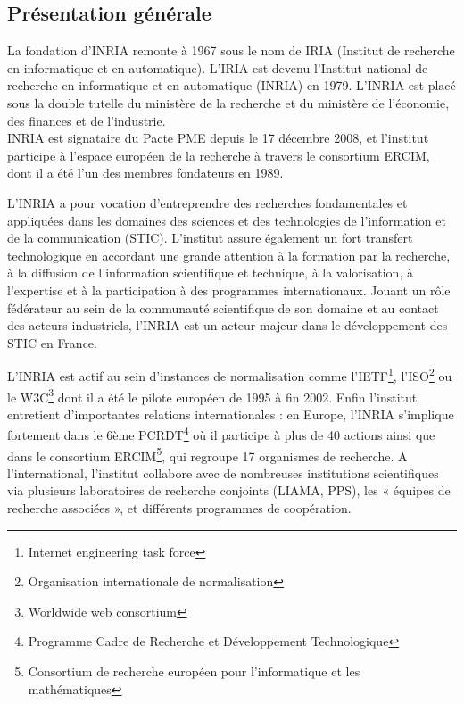 \documentclass[a4paper, 11pt]{report}
\begin{document}
    \subsection{Présentation générale}
    La fondation d'INRIA remonte à 1967 sous le nom de IRIA (Institut de
    recherche en informatique et en automatique). L'IRIA est devenu l'Institut
    national de recherche en informatique et en automatique (INRIA) en 1979.
    L'INRIA est placé sous la double tutelle du ministère de la recherche et
    du ministère de l'économie, des finances et de l'industrie. \\
    INRIA est signataire du Pacte PME depuis le 17 décembre 2008, et l'institut
    participe à l'espace européen de la recherche à travers le consortium
    ERCIM, dont il a été l'un des membres fondateurs en 1989.

    L’INRIA a pour vocation d’entreprendre des recherches fondamentales et
    appliquées dans les domaines des sciences et des technologies de l’information
    et de la communication (STIC). L’institut assure également un fort
    transfert technologique en accordant une grande attention à la formation
    par la recherche, à la diffusion de l’information scientifique et
    technique, à la valorisation, à l’expertise et à la participation à des
    programmes internationaux. Jouant un rôle fédérateur au sein de la
    communauté scientifique de son domaine et au contact des acteurs
    industriels, l’INRIA est un acteur majeur dans le développement des STIC en
    France.

    L’INRIA est actif au sein d’instances de normalisation comme l’IETF\footnote{Internet engineering task force},
    l’ISO\footnote{Organisation internationale de normalisation} ou le W3C\footnote{Worldwide web consortium} dont il a été le pilote européen de 1995 à fin 2002.
    Enfin l’institut entretient d’importantes relations internationales : en
    Europe, l’INRIA s’implique fortement dans le 6ème PCRDT\footnote{Programme Cadre de Recherche et Développement Technologique} où il participe
    à plus de 40 actions ainsi que dans le consortium ERCIM\footnote{Consortium de recherche européen pour l'informatique et les mathématiques}, qui regroupe 17
    organismes de recherche. A l’international, l’institut collabore avec de
    nombreuses institutions scientifiques via plusieurs laboratoires de
    recherche conjoints (LIAMA, PPS), les « équipes de recherche associées »,
    et différents programmes de coopération.
\end{document}
